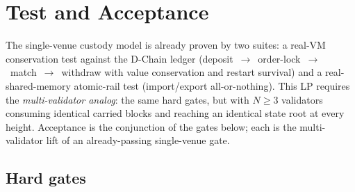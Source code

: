 \section{Test and Acceptance}
\label{sec:acceptance}

The single-venue custody model is already proven by two suites: a
real-VM conservation test against the D-Chain ledger
(deposit~$\to$~order-lock~$\to$~match~$\to$~withdraw with value
conservation and restart survival) and a real-shared-memory atomic-rail
test (import/export all-or-nothing). This LP requires the
\emph{multi-validator analog}: the same hard gates, but with $N \ge 3$
validators consuming identical carried blocks and reaching an identical
state root at every height. Acceptance is the conjunction of the gates
below; each is the multi-validator lift of an already-passing
single-venue gate.

\subsection{Hard gates}


